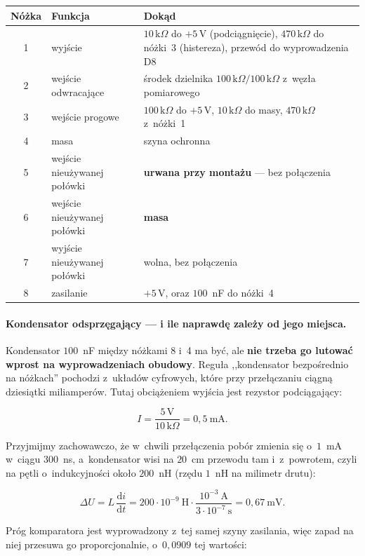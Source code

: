 \documentclass[a4paper,11pt]{article}
\newcommand{\kohm}{\,\mathrm{k}\Omega}
\newcommand{\volt}{\,\mathrm{V}}
\begin{document}
\begin{center}
\begin{tabular}{clp{8.6cm}}
\toprule
Nóżka & Funkcja & Dokąd \\
\midrule
1 & wyjście & $10\kohm$ do $+5\volt$ (podciągnięcie), $470\kohm$ do nóżki~3
    (histereza), przewód do wyprowadzenia D8 \\
2 & wejście odwracające & środek dzielnika $100\kohm/100\kohm$ z~węzła
    pomiarowego \\
3 & wejście progowe & $100\kohm$ do $+5\volt$, $10\kohm$ do masy, $470\kohm$
    z~nóżki~1 \\
4 & masa & szyna ochronna \\
5 & wejście nieużywanej połówki & \textbf{urwana przy montażu} --- bez połączenia \\
6 & wejście nieużywanej połówki & \textbf{masa} \\
7 & wyjście nieużywanej połówki & wolna, bez połączenia \\
8 & zasilanie & $+5\volt$, oraz $100$~nF do nóżki~4 \\
\bottomrule
\end{tabular}
\end{center}

\paragraph{Kondensator odsprzęgający --- i ile naprawdę zależy od jego miejsca.}
Kondensator $100$~nF między nóżkami 8 i~4 ma być, ale \textbf{nie trzeba go lutować
wprost na wyprowadzeniach obudowy}. Reguła ,,kondensator bezpośrednio na nóżkach''
pochodzi z~układów cyfrowych, które przy przełączaniu ciągną dziesiątki
miliamperów. Tutaj obciążeniem wyjścia jest rezystor podciągający:

\[
I=\frac{5\volt}{10\kohm}=0{,}5\ \mathrm{mA}.
\]

Przyjmijmy zachowawczo, że w~chwili przełączenia pobór zmienia się o~$1$~mA
w~ciągu $300$~ns, a~kondensator wisi na $20$~cm przewodu tam i~z~powrotem, czyli
na pętli o~indukcyjności około $200$~nH (rzędu $1$~nH na milimetr drutu):

\[
\Delta U = L\,\frac{\mathrm{d}i}{\mathrm{d}t}
         = 200\cdot10^{-9}\ \mathrm{H}\cdot\frac{10^{-3}\ \mathrm{A}}{3\cdot10^{-7}\ \mathrm{s}}
         = 0{,}67\ \mathrm{mV}.
\]

Próg komparatora jest wyprowadzony z~tej samej szyny zasilania, więc zapad na niej
przesuwa go proporcjonalnie, o~$0{,}0909$ tej wartości:
\end{document}
